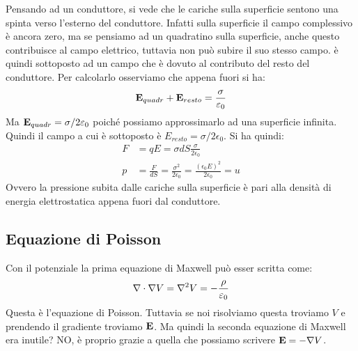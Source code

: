 Pensando ad un conduttore, si vede che le cariche sulla superficie sentono una spinta verso l'esterno del conduttore. Infatti sulla superficie il campo complessivo è ancora zero, ma se pensiamo ad un quadratino sulla superficie, anche questo contribuisce al campo elettrico, tuttavia non può subire il suo stesso campo. è quindi sottoposto ad un campo che è dovuto al contributo del resto del conduttore. Per calcolarlo osserviamo che appena fuori si ha:
\begin{equation}
    \mathbf E_{quadr} + \mathbf E_{resto} = \frac{ \sigma }{ \varepsilon_0 } 
\end{equation}
Ma $\mathbf E_{quadr} = \sigma /2\varepsilon_0$ poiché possiamo approssimarlo ad una superficie infinita. Quindi il campo a cui è sottoposto è $E_{resto} = \sigma /2\epsilon_0$. Si ha quindi:
\begin{align}
    F &= qE = \sigma dS \frac{ \sigma }{ 2 \epsilon_0 } \\
    p &= \frac{ F }{ dS } = \frac{ \sigma^2 }{ 2 \epsilon_0 } = \frac{ (\epsilon_0 E)^2 }{ 2 \epsilon_0 } = u
\end{align}
Ovvero la pressione subita dalle cariche sulla superficie è pari alla densità di energia elettrostatica appena fuori dal conduttore.


\subsection{Equazione di Poisson} %
\label{sub:equazione_di_poisson}
Con il potenziale la prima equazione di Maxwell può esser scritta come:
\begin{equation}
    \nabla \cdot \nabla V = \nabla^2 V = - \frac{ \rho }{ \varepsilon_0 } 
\end{equation}
Questa è l'equazione di Poisson. Tuttavia se noi risolviamo questa troviamo $V$ e prendendo il gradiente troviamo $\mathbf E$. Ma quindi la seconda equazione di Maxwell era inutile? NO, è proprio grazie a quella che possiamo scrivere $\mathbf E = - \nabla V$. 

